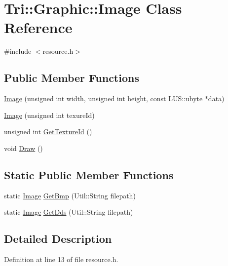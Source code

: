 \hypertarget{class_tri_1_1_graphic_1_1_image}{}\section{Tri\+:\+:Graphic\+:\+:Image Class Reference}
\label{class_tri_1_1_graphic_1_1_image}


{\ttfamily \#include $<$resource.\+h$>$}

\subsection*{Public Member Functions}
\begin{DoxyCompactItemize}
\item 
\hyperlink{class_tri_1_1_graphic_1_1_image_a6b643da93b3fb2c4dd49615b72a3a0d5}{Image} (unsigned int width, unsigned int height, const L\+U\+S\+::ubyte $\ast$data)
\item 
\hyperlink{class_tri_1_1_graphic_1_1_image_af1a11b13c3544391e470b66103c8f355}{Image} (unsigned int texure\+Id)
\item 
unsigned int \hyperlink{class_tri_1_1_graphic_1_1_image_a4cf866cbf689b64d901576b70a1bf692}{Get\+Texture\+Id} ()
\item 
void \hyperlink{class_tri_1_1_graphic_1_1_image_a389344f423410008278a810945cdb5f7}{Draw} ()
\end{DoxyCompactItemize}
\subsection*{Static Public Member Functions}
\begin{DoxyCompactItemize}
\item 
static \hyperlink{class_tri_1_1_graphic_1_1_image}{Image} \hyperlink{class_tri_1_1_graphic_1_1_image_a032c706644e420edcddabfc0ee93f1ce}{Get\+Bmp} (Util\+::\+String filepath)
\item 
static \hyperlink{class_tri_1_1_graphic_1_1_image}{Image} \hyperlink{class_tri_1_1_graphic_1_1_image_a9769601595adf7084c01c999de322264}{Get\+Dds} (Util\+::\+String filepath)
\end{DoxyCompactItemize}


\subsection{Detailed Description}


Definition at line 13 of file resource.\+h.



